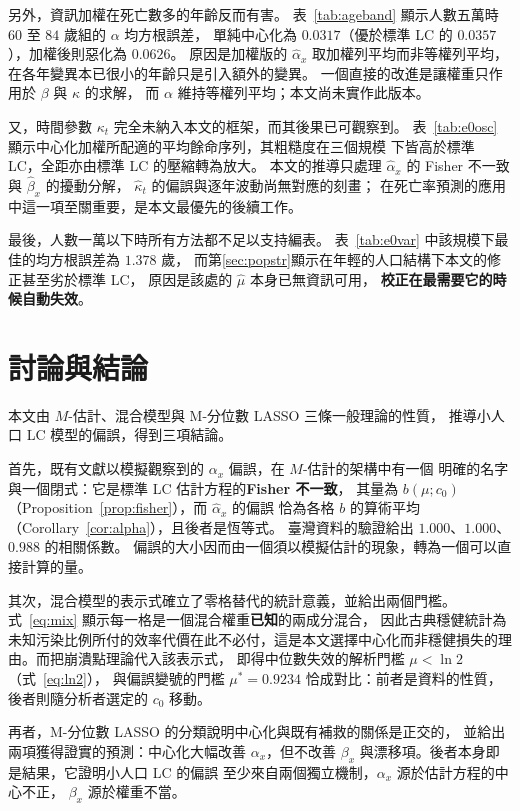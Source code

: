 \documentclass[UTF8, fontset=macnew, a4paper, 12pt]{ctexart}
\begin{document}
另外，資訊加權在死亡數多的年齡反而有害。
表~\ref{tab:ageband} 顯示人數五萬時 $60$ 至 $84$ 歲組的 $\alpha$ 均方根誤差，
單純中心化為 $0.0317$（優於標準 LC 的 $0.0357$），加權後則惡化為 $0.0626$。
原因是加權版的 $\hat\alpha_x$ 取加權列平均而非等權列平均，
在各年變異本已很小的年齡只是引入額外的變異。
一個直接的改進是讓權重只作用於 $\beta$ 與 $\kappa$ 的求解，
而 $\alpha$ 維持等權列平均；本文尚未實作此版本。

又，時間參數 $\kappa_t$ 完全未納入本文的框架，而其後果已可觀察到。
表~\ref{tab:e0osc} 顯示中心化加權所配適的平均餘命序列，其粗糙度在三個規模
下皆高於標準 LC，全距亦由標準 LC 的壓縮轉為放大。
本文的推導只處理 $\hat\alpha_x$ 的 Fisher 不一致與 $\hat\beta_x$ 的擾動分解，
$\hat\kappa_t$ 的偏誤與逐年波動尚無對應的刻畫；
在死亡率預測的應用中這一項至關重要，是本文最優先的後續工作。

最後，人數一萬以下時所有方法都不足以支持編表。
表~\ref{tab:e0var} 中該規模下最佳的均方根誤差為 $1.378$ 歲，
而第\ref{sec:popstr}顯示在年輕的人口結構下本文的修正甚至劣於標準 LC，
原因是該處的 $\hat\mu$ 本身已無資訊可用，
\textbf{校正在最需要它的時候自動失效}。

\section{討論與結論}\label{sec:disc}

本文由 $M$-估計、混合模型與 M-分位數 LASSO 三條一般理論的性質，
推導小人口 LC 模型的偏誤，得到三項結論。

首先，既有文獻以模擬觀察到的 $\alpha_x$ 偏誤，在 $M$-估計的架構中有一個
明確的名字與一個閉式：它是標準 LC 估計方程的\textbf{Fisher 不一致}，
其量為 $b(\mu;c_0)$（Proposition~\ref{prop:fisher}），而 $\hat\alpha_x$ 的偏誤
恰為各格 $b$ 的算術平均（Corollary~\ref{cor:alpha}），且後者是恆等式。
臺灣資料的驗證給出 $1.000$、$1.000$、$0.988$ 的相關係數。
偏誤的大小因而由一個須以模擬估計的現象，轉為一個可以直接計算的量。

其次，混合模型的表示式確立了零格替代的統計意義，並給出兩個門檻。
式~\eqref{eq:mix} 顯示每一格是一個混合權重\textbf{已知}的兩成分混合，
因此古典穩健統計為未知污染比例所付的效率代價在此不必付，這是本文選擇中心化而非穩健損失的理由。而把崩潰點理論代入該表示式，
即得中位數失效的解析門檻 $\mu<\ln2$（式~\eqref{eq:ln2}），
與偏誤變號的門檻 $\mu^\ast=0.9234$ 恰成對比：前者是資料的性質，
後者則隨分析者選定的 $c_0$ 移動。

再者，M-分位數 LASSO 的分類說明中心化與既有補救的關係是正交的，
並給出兩項獲得證實的預測：中心化大幅改善 $\alpha_x$，但不改善
$\beta_x$ 與漂移項。後者本身即是結果，它證明小人口 LC 的偏誤
至少來自兩個獨立機制，$\alpha_x$ 源於估計方程的中心不正，
$\beta_x$ 源於權重不當。
\end{document}
